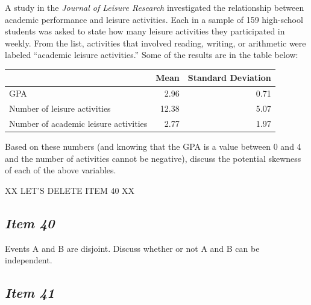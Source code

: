 A study in the \textit{Journal of Leisure Research} investigated the relationship between academic performance and leisure activities. Each in a sample of 159 high-school students was asked to state how many leisure activities they participated in weekly. From the list, activities that involved reading, writing, or arithmetic were labeled ``academic leisure activities.'' Some of the results are in the table below:





\begin{table}[!ht]


\begin{center}


\begin{tabular}{lrr}


\hline


& Mean & Standard Deviation\\


\hline


GPA & 2.96 & 0.71\\


Number of leisure activities & 12.38 & 5.07\\


Number of academic leisure activities & 2.77 & 1.97\\


\hline


\end{tabular}


\end{center}


\end{table}





Based on these numbers (and knowing that the GPA is a value between 0 and 4 and the number of activities cannot be negative), discuss the potential skewness of each of the above variables.

XX LET’S DELETE ITEM 40 XX
\subsection{\textbf{\textit{Item 40}}}


Events A and B are disjoint. Discuss whether or not A and B can be independent. 





\subsection{\textbf{\textit{Item 41}}}


